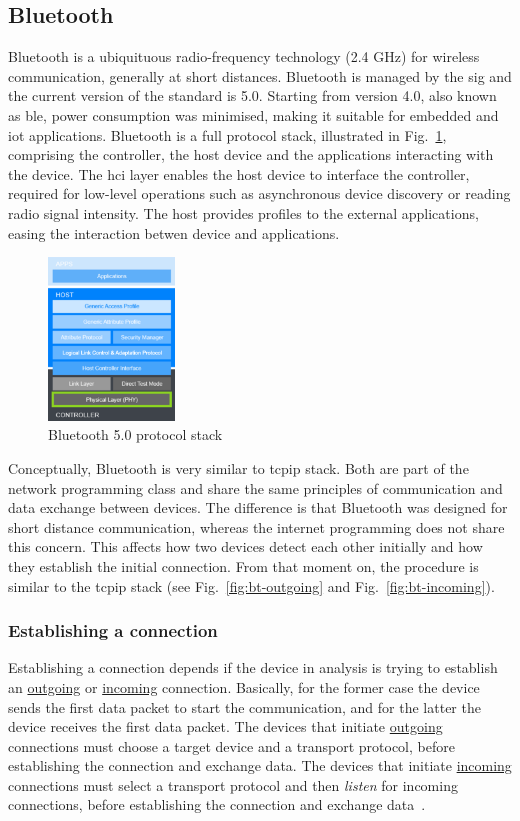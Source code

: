 \subsection{Bluetooth}%
\label{sec:bluetooth}
Bluetooth is a ubiquituous radio-frequency technology (2.4 GHz) for wireless
communication, generally at short distances. Bluetooth is managed by the
\gls{sig} and the current version of the standard
is 5.0. Starting from version 4.0, also known as \gls{ble}, power consumption
was minimised, making it suitable for embedded and \gls{iot}
applications. Bluetooth is a full protocol stack, illustrated in
Fig.~\ref{fig:ble-stack}, comprising the controller, the host device and the
applications interacting with the device. The \gls{hci} layer enables the host
device to interface the controller, required for low-level operations such as
asynchronous device discovery or reading radio signal intensity. The host
provides profiles to the external applications, easing the interaction betwen
device and applications.
%
\begin{figure}[!hbt]
\centering
\includegraphics[width=0.30\textwidth]{./img/ble-stack.png}
  \caption{Bluetooth 5.0 protocol stack}%
\label{fig:ble-stack}
\end{figure}
%
Conceptually, Bluetooth is very similar to \gls{tcpip} stack. Both are part of
the network programming class and share the same principles of communication and
data exchange between devices. The difference is that Bluetooth was designed for
short distance communication, whereas the internet programming does not share
this concern. This affects how two devices detect each other initially and how
they establish the initial connection. From that moment on, the procedure is
similar to the \gls{tcpip} stack (see Fig.~\ref{fig:bt-outgoing} and
Fig.~\ref{fig:bt-incoming}).
%
\subsubsection{Establishing a connection}%
\label{sec:bt-establish-conn}
Establishing a connection depends if the device in analysis is trying to
establish an \uline{outgoing} or \uline{incoming} connection. Basically, for the
former case the device sends the first data packet to start the communication,
and for the latter the device receives the first data packet. The devices that
initiate \uline{outgoing} connections must choose a target device and a
transport protocol, before establishing the connection and exchange data. The
devices that initiate \uline{incoming} connections must select a transport
protocol and then \textit{listen} for incoming connections, before establishing
the connection and exchange data~\cite{huang2007bluetooth}.

